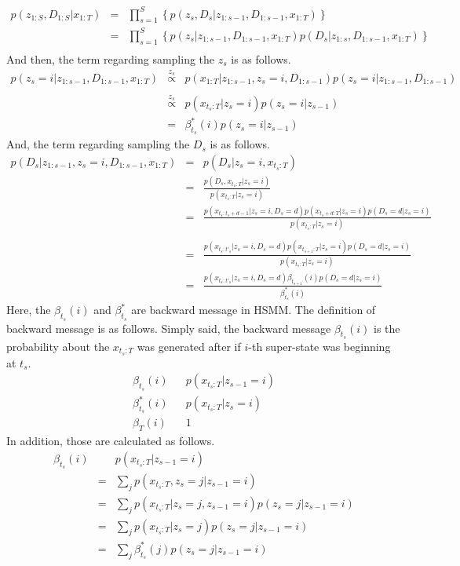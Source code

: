\documentclass[a4paper]{article}
\newcommand{\proptoas}[1]{\overset{#1}{\propto}}
\DeclareMathOperator{\defeq}{\ensuremath{\stackrel{\mathrm{def}}{=}}}
\begin{document}
\begin{eqnarray}
	p(z_{1:S}, D_{1:S} | x_{1:T})
	&=&
	\prod_{s=1}^{S}{\left\{ p(z_s, D_s  |  z_{1:s-1}, D_{1:s-1}, x_{1:T}) \right\}}\\
	&=&
	\prod_{s=1}^{S}{\left\{ p(z_s |  z_{1:s-1}, D_{1:s-1}, x_{1:T}) p(D_s | z_{1:s}, D_{1:s-1}, x_{1:T})\right\}} \nonumber \\
\end{eqnarray}
And then, the term regarding sampling the $z_s$ is as follows.
\begin{eqnarray}
	p(z_s = i |  z_{1:s-1}, D_{1:s-1}, x_{1:T})
	&\proptoas{z_s}&
	p(x_{1:T} | z_{1:s-1}, z_s = i, D_{1:s-1}) p(z_s = i | z_{1:s-1}, D_{1:s-1}) \nonumber \\ \\
	&\proptoas{z_s}&
	p(x_{t_s:T} | z_s = i) p(z_s = i | z_{s-1}) \\
	&=&
	\beta_{t_s}^{*}(i) p(z_s = i | z_{s-1})
\end{eqnarray}
And, the term regarding sampling the $D_s$ is as follows.
\begin{eqnarray}
	p(D_s | z_{1:s-1}, z_s = i, D_{1:s-1}, x_{1:T})
	&=&
	p(D_s | z_s = i, x_{t_s:T}) \\
	&=&
	\frac{p(D_s, x_{t_s:T} | z_s = i)}{p(x_{t_s:T} | z_s = i)}\\
	&=&
	\frac{p(x_{t_s:t_s+d-1} | z_s = i, D_s = d) p(x_{t_s+d:T} | z_s = i) p(D_s = d| z_s = i)}{p(x_{t_s:T} | z_s = i)} \nonumber \\
	\\
	&=&
	\frac{p(x_{t_s:t'_s} | z_s = i, D_s = d) p(x_{t_{s+1}:T} | z_s = i) p(D_s = d| z_s = i)}{p(x_{t_s:T} | z_s = i)} \\
	&=&
	\frac{p(x_{t_s:t'_s} | z_s = i, D_s = d) \beta_{t_{s+1}}(i) p(D_s = d| z_s = i)}{\beta_{t_s}^{*}(i)}
\end{eqnarray}
Here, the $\beta_{t_s}(i)$ and $\beta_{t_s}^{*}$ are backward message in HSMM.
The definition of backward message is as follows.
Simply said, the backward message $\beta_{t_s}(i)$ is the probability about the $x_{t_s:T}$ was generated after if $i$-th super-state was beginning at $t_s$.
\begin{eqnarray}
	\beta_{t_s}(i)
	&\defeq&
	p(x_{t_s:T} | z_{s-1} = i) \\
	\beta_{t_s}^{*}(i)
	&\defeq&
	p(x_{t_s:T} | z_s = i) \\
	\beta_{T}(i)
	&\defeq&
	1
\end{eqnarray}
In addition, those are calculated as follows.
\begin{eqnarray}
	\beta_{t_s}(i)
	&\defeq&
	p(x_{t_s:T} | z_{s-1} = i) \\
	&=&
	\sum_{j}{p(x_{t_s:T}, z_s = j | z_{s-1} = i)} \\
	&=&
	\sum_{j}{p(x_{t_s:T} | z_s = j, z_{s-1} = i) p(z_s = j | z_{s-1} = i)} \\
	&=&
	\sum_{j}{p(x_{t_s:T} | z_s = j) p(z_s = j | z_{s-1} = i)} \\
	&=&
	\sum_{j}{\beta_{t_s}^{*}(j) p(z_s = j | z_{s-1} = i)}
\end{eqnarray}
\end{document}
